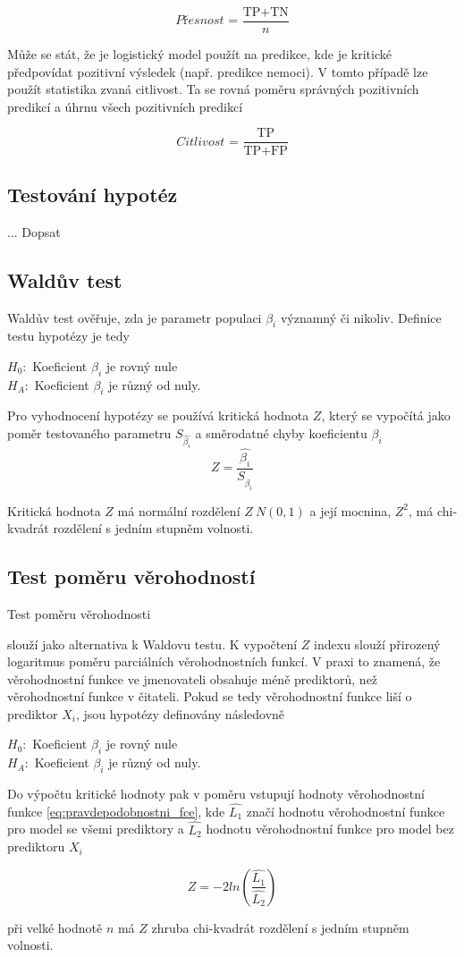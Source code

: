 {\begin{equation}
    \textit{Přesnost = } \frac{\text{TP} + \text{TN}}{n}
\end{equation}

Může se stát, že je logistický model použít na predikce, kde je kritické předpovídat pozitivní výsledek (např. predikce nemoci). V tomto případě lze
použít statistika zvaná citlivost. Ta se rovná poměru správných pozitivních predikcí a úhrnu všech pozitivních predikcí

\begin{equation}
    \textit{Citlivost = } \frac{\text{TP}}{\text{TP} + \text{FP}}
\end{equation}

}

{\color{red}
\subsection{Testování hypotéz}
... Dopsat
}

\subsection{Waldův test}
{\color{red}
Waldův test ověřuje, zda je parametr
populaci
}
 $\beta_i$ významný či nikoliv. Definice
testu hypotézy je tedy

$H_0:$ Koeficient $\beta_i$ je rovný nule \\
$H_A:$ Koeficient $\beta_i$ je různý od nuly.

{\color{red}
Pro vyhodnocení hypotézy se používá kritická hodnota $Z$, který se vypočítá jako poměr testovaného parametru $S_{\hat{\beta_i}}$
a směrodatné chyby koeficientu $\beta_i$
}
\begin{equation}
    Z = \frac{\hat{\beta_i}}{S_{\hat{\beta_i}}}
\end{equation}

Kritická hodnota $Z$ má normální rozdělení $Z ~ N(0, 1)$ a její mocnina, $Z^2$, má chi-kvadrát rozdělení s jedním stupněm volnosti.

\subsection{Test poměru věrohodností}
Test poměru věrohodnosti 
{\color{red}
slouží jako alternativa k Waldovu testu. K vypočtení $Z$ indexu slouží přirozený logaritmus poměru parciálních věrohodnostních funkcí.
V praxi to znamená, že věrohodnostní funkce ve jmenovateli obsahuje méně prediktorů, než věrohodnostní funkce v čitateli.
Pokud se tedy věrohodnostní funkce liší o prediktor $X_i$, jsou hypotézy definovány následovně

$H_0:$ Koeficient $\beta_i$ je rovný nule \\
$H_A:$ Koeficient $\beta_i$ je různý od nuly.

Do výpočtu kritické hodnoty pak v poměru vstupují hodnoty věrohodnostní funkce \ref{eq:pravdepodobnostni_fce}, kde 
$\hat{L_1}$ značí hodnotu věrohodnostní funkce pro model se všemi prediktory a $\hat{L_2}$ hodnotu věrohodnostní funkce pro model bez 
prediktoru $X_i$
}

\begin{equation}
    Z = -2ln(\frac{\hat{L_1}}{\hat{L_2}})
\end{equation}

při velké hodnotě $n$ má $Z$ zhruba chi-kvadrát rozdělení s jedním stupněm volnosti.
